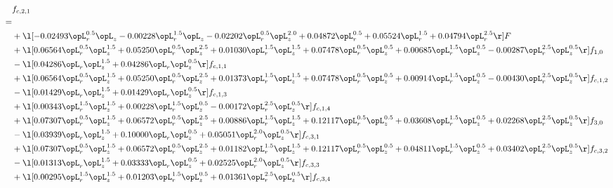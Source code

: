 \begin{alignat}{2} 
\label{eq:f_21_1} 
& f_{c,2,1} \nonumber \\ 
 = \\ 
& + \l[  -0.02493 \opL_r^{0.5} \opL_z   -0.00228 \opL_r^{1.5} \opL_z   -0.02202 \opL_r^{0.5} \opL_z^{2.0} +  0.04872 \opL_r^{0.5} +  0.05524 \opL_r^{1.5} +  0.04794 \opL_r^{2.5}  \r] F \nonumber \\ 
& + \l[  0.06564 \opL_r^{0.5} \opL_z^{1.5} +  0.05250 \opL_r^{0.5} \opL_z^{2.5} +  0.01030 \opL_r^{1.5} \opL_z^{1.5} +  0.07478 \opL_r^{0.5} \opL_z^{0.5} +  0.00685 \opL_r^{1.5} \opL_z^{0.5}   -0.00287 \opL_r^{2.5} \opL_z^{0.5}  \r] f_{1,0} \nonumber \\ 
& - \l[  0.04286 \opL_r \opL_z^{1.5} +  0.04286 \opL_r \opL_z^{0.5}  \r] f_{c,1,1} \nonumber \\ 
& + \l[  0.06564 \opL_r^{0.5} \opL_z^{1.5} +  0.05250 \opL_r^{0.5} \opL_z^{2.5} +  0.01373 \opL_r^{1.5} \opL_z^{1.5} +  0.07478 \opL_r^{0.5} \opL_z^{0.5} +  0.00914 \opL_r^{1.5} \opL_z^{0.5}   -0.00430 \opL_r^{2.5} \opL_z^{0.5}  \r] f_{c,1,2} \nonumber \\ 
& - \l[  0.01429 \opL_r \opL_z^{1.5} +  0.01429 \opL_r \opL_z^{0.5}  \r] f_{c,1,3} \nonumber \\ 
& + \l[  0.00343 \opL_r^{1.5} \opL_z^{1.5} +  0.00228 \opL_r^{1.5} \opL_z^{0.5}   -0.00172 \opL_r^{2.5} \opL_z^{0.5}  \r] f_{c,1,4} \nonumber \\ 
& + \l[  0.07307 \opL_r^{0.5} \opL_z^{1.5} +  0.06572 \opL_r^{0.5} \opL_z^{2.5} +  0.00886 \opL_r^{1.5} \opL_z^{1.5} +  0.12117 \opL_r^{0.5} \opL_z^{0.5} +  0.03608 \opL_r^{1.5} \opL_z^{0.5} +  0.02268 \opL_r^{2.5} \opL_z^{0.5}  \r] f_{3,0} \nonumber \\ 
& - \l[  0.03939 \opL_r \opL_z^{1.5} +  0.10000 \opL_r \opL_z^{0.5} +  0.05051 \opL_r^{2.0} \opL_z^{0.5}  \r] f_{c,3,1} \nonumber \\ 
& + \l[  0.07307 \opL_r^{0.5} \opL_z^{1.5} +  0.06572 \opL_r^{0.5} \opL_z^{2.5} +  0.01182 \opL_r^{1.5} \opL_z^{1.5} +  0.12117 \opL_r^{0.5} \opL_z^{0.5} +  0.04811 \opL_r^{1.5} \opL_z^{0.5} +  0.03402 \opL_r^{2.5} \opL_z^{0.5}  \r] f_{c,3,2} \nonumber \\ 
& - \l[  0.01313 \opL_r \opL_z^{1.5} +  0.03333 \opL_r \opL_z^{0.5} +  0.02525 \opL_r^{2.0} \opL_z^{0.5}  \r] f_{c,3,3} \nonumber \\ 
& + \l[  0.00295 \opL_r^{1.5} \opL_z^{1.5} +  0.01203 \opL_r^{1.5} \opL_z^{0.5} +  0.01361 \opL_r^{2.5} \opL_z^{0.5}  \r] f_{c,3,4} \nonumber \\ 

\end{alignat}
